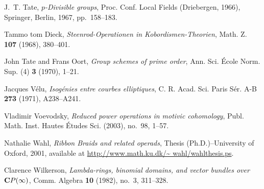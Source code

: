 \documentclass{gtpart}
\theoremstyle{definition}
\theoremstyle{remark}
\numberwithin{equation}{section}
\numberwithin{thm}{section}
\begin{document}
\begin{thebibliography}
J.~T. Tate, \emph{{$p$}-{D}ivisible groups}, Proc. {C}onf. {L}ocal {F}ields
  ({D}riebergen, 1966), Springer, Berlin, 1967, pp.~158--183. 

Tammo tom Dieck, \emph{Steenrod-{O}perationen in {K}obordismen-{T}heorien},
  Math. Z. \textbf{107} (1968), 380--401. 

John Tate and Frans Oort, \emph{Group schemes of prime order}, Ann. Sci.
  \'Ecole Norm. Sup. (4) \textbf{3} (1970), 1--21. 

Jacques V{\'e}lu, \emph{Isog\'enies entre courbes elliptiques}, C. R. Acad.
  Sci. Paris S\'er. A-B \textbf{273} (1971), A238--A241. 

Vladimir Voevodsky, \emph{Reduced power operations in motivic cohomology},
  Publ. Math. Inst. Hautes \'Etudes Sci. (2003), no.~98, 1--57. 

Nathalie Wahl, \emph{Ribbon {B}raids and related operads}, Thesis
  (Ph.D.)--University of Oxford, 2001, available at
  \href{http://www.math.ku.dk/~wahl/wahlthesis.ps}{http://www.math.ku.dk/\textasciitilde
  wahl/wahlthesis.ps}.

Clarence Wilkerson, \emph{Lambda-rings, binomial domains, and vector bundles
  over {${\bf C}P(\infty )$}}, Comm. Algebra \textbf{10} (1982), no.~3,
  311--328. 

\end{thebibliography}
\end{document}
